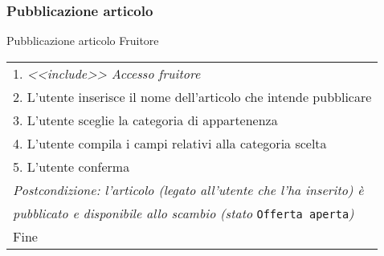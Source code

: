 \begin{minipage}{\textwidth}
    \subsubsection{Pubblicazione articolo}
    \usecase
        {Pubblicazione articolo}
        {
            Fruitore %
        }
        {
            \begin{tabular}{l}
                1. \textit{<<include>> Accesso fruitore}\\
                2. L'utente inserisce il nome dell'articolo che intende pubblicare\\
                3. L'utente sceglie la categoria di appartenenza\\
                4. L'utente compila i campi relativi alla categoria scelta\\
                5. L'utente conferma\\
                \textit{Postcondizione: l'articolo (legato all'utente che l'ha inserito) è}\\
                \textit{pubblicato e disponibile allo scambio (stato }\texttt{Offerta aperta}\textit{)}\\
                Fine
            \end{tabular}\\

            \\

            \\

}
\end{minipage}
